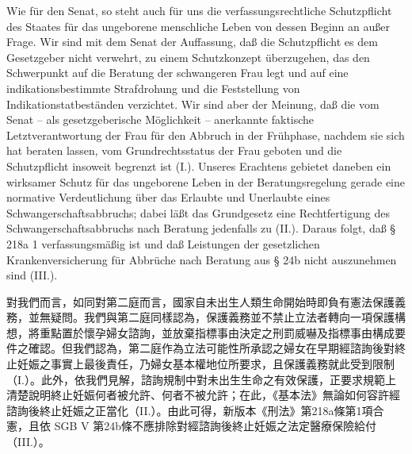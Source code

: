 \documentclass[12pt]{article}
\begin{document}
\begin{sourcepara}[title={原文SondervotumMS.271}]
Wie für den Senat, so steht auch für uns die verfassungsrechtliche Schutzpflicht des Staates für das ungeborene menschliche Leben von dessen Beginn an außer Frage. Wir sind mit dem Senat der Auffassung, daß die Schutzpflicht es dem Gesetzgeber nicht verwehrt, zu einem Schutzkonzept überzugehen, das den Schwerpunkt auf die Beratung der schwangeren Frau legt und auf eine indikationsbestimmte Strafdrohung und die Feststellung von Indikationstatbeständen verzichtet. Wir sind aber der Meinung, daß die vom Senat -- als gesetzgeberische Möglichkeit -- anerkannte faktische Letztverantwortung der Frau für den Abbruch in der Frühphase, nachdem sie sich hat beraten lassen, vom Grundrechtsstatus der Frau geboten und die Schutzpflicht insoweit begrenzt ist (I.). Unseres Erachtens gebietet daneben ein wirksamer Schutz für das ungeborene Leben in der Beratungsregelung gerade eine normative Verdeutlichung über das Erlaubte und Unerlaubte eines Schwangerschaftsabbruchs; dabei läßt das Grundgesetz eine Rechtfertigung des Schwangerschaftsabbruchs nach Beratung jedenfalls zu (II.). Daraus folgt, daß § 218a \abbrAbs{} 1 \abbrStGB{} \abbrNF{} verfassungsmäßig ist und daß Leistungen der gesetzlichen Krankenversicherung für Abbrüche nach Beratung aus § 24b \abbrSGBV{} nicht auszunehmen sind (III.).
\end{sourcepara}
\begin{transpara}
對我們而言，如同對第二庭而言，國家自未出生人類生命開始時即負有憲法保護義務，並無疑問。我們與第二庭同樣認為，保護義務並不禁止立法者轉向一項保護構想，將重點置於懷孕婦女諮詢，並放棄指標事由決定之刑罰威嚇及指標事由構成要件之確認。但我們認為，第二庭作為立法可能性所承認之婦女在早期經諮詢後對終止妊娠之事實上最後責任，乃婦女基本權地位所要求，且保護義務就此受到限制（I.）。此外，依我們見解，諮詢規制中對未出生生命之有效保護，正要求規範上清楚說明終止妊娠何者被允許、何者不被允許；在此，《基本法》無論如何容許經諮詢後終止妊娠之正當化（II.）。由此可得，新版本《刑法》第218a條第1項合憲，且依 SGB V 第24b條不應排除對經諮詢後終止妊娠之法定醫療保險給付（III.）。
\end{transpara}

\end{document}
